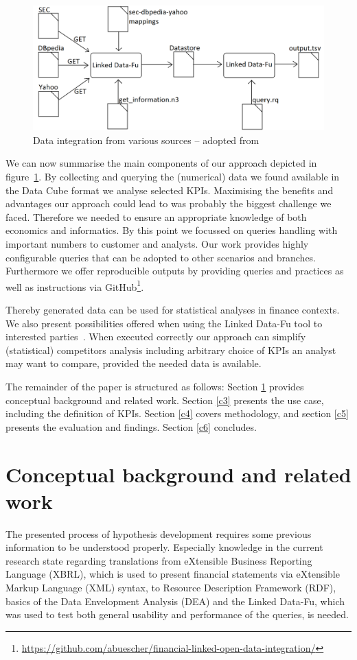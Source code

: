 \documentclass[runningheads]{llncs}
\begin{document}
\begin{figure}[htb]
\centering
\includegraphics[scale=0.24]{1_graphics/extract.png}
\caption{Data integration from various sources -- adopted from \cite{KWOW14}}\label{fig:overview}
\end{figure}

We can now summarise the main components of our approach depicted in figure~\ref{fig:overview}.
By collecting and querying the (numerical) data we found available in the Data Cube format we analyse selected KPIs. %
Maximising the benefits and advantages our approach could lead to was probably the biggest challenge we faced.
Therefore we needed to ensure an appropriate knowledge of both economics and informatics.
By this point we focussed on queries handling with important numbers to customer and analysts.
Our work provides highly configurable queries that can be adopted to other scenarios and branches.
Furthermore we offer reproducible outputs by providing queries and practices as well as instructions via GitHub\footnote{\url{https://github.com/abuescher/financial-linked-open-data-integration/}}.

Thereby generated data can be used for statistical analyses in finance contexts.
We also present possibilities offered when using the Linked Data-Fu tool to interested parties~\cite{SSHS13}.
When executed correctly our approach can simplify (statistical) competitors analysis including arbitrary choice of KPIs an analyst may want to compare, provided the needed data is available.

The remainder of the paper is structured as follows:
Section \ref{c2} provides conceptual background and related work.
Section \ref{c3} presents the use case, including the definition of KPIs.
Section \ref{c4} covers methodology, and section \ref{c5} presents the evaluation and findings.
Section \ref{c6} concludes.

\section{Conceptual background and related work}\label{c2}
The presented process of hypothesis development requires some previous information to be understood properly.
Especially knowledge in the current research state regarding translations from eXtensible Business Reporting Language (XBRL), which is used to present financial statements via eXtensible Markup Language (XML) syntax, to Resource Description Framework (RDF), basics of the Data Envelopment Analysis (DEA) and the Linked Data-Fu, which was used to test both general usability and performance of the queries, is needed.
\end{document}
